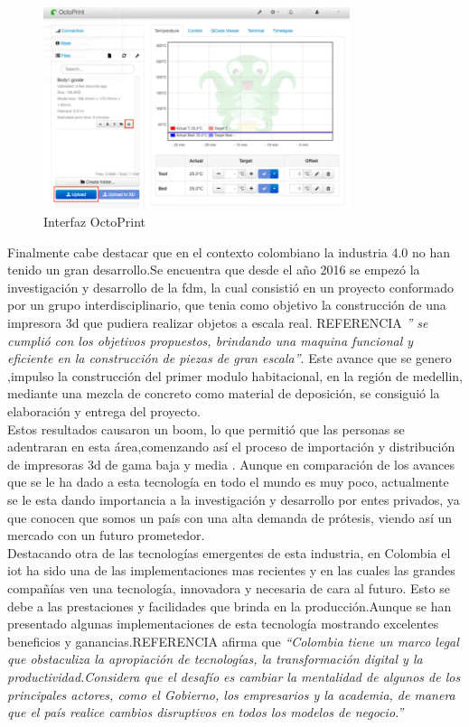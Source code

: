 \begin{figure}[H]
    \centering
    \includegraphics[width=0.8\textwidth]{Figs/octoprint.PNG}
    \caption{Interfaz OctoPrint\citep{} }
     \label{fig:octo}
\end{figure}

Finalmente cabe destacar que en el contexto colombiano la industria 4.0 no han tenido un gran desarrollo.Se encuentra que desde el año 2016 se empezó la investigación y desarrollo de la \acrshort{fdm}, la cual consistió en un proyecto conformado por un grupo interdisciplinario, que tenia como objetivo la construcción de una impresora 3d que pudiera realizar objetos a escala real. REFERENCIA\textit{ '' se cumplió con los objetivos propuestos, brindando una maquina funcional y eficiente en la construcción de piezas de gran escala''}. Este avance que se genero ,impulso la  construcción del primer modulo habitacional, en la región de medellin, mediante una mezcla de concreto como material de deposición, se consiguió la elaboración y entrega del proyecto.\\

Estos resultados causaron un boom, lo que permitió que las personas se adentraran en esta área,comenzando así el proceso de importación y distribución de impresoras 3d de gama baja y media . Aunque en comparación de los avances que se le ha dado a esta tecnología en todo el mundo es muy poco, actualmente se le esta dando importancia a la investigación y desarrollo por entes privados, ya que conocen que somos un país con una alta demanda de prótesis, viendo así un mercado con un futuro prometedor.\\

Destacando otra de las tecnologías emergentes de esta industria, en Colombia el \acrshort{iot} ha sido una de las implementaciones mas recientes y en las cuales las grandes compañías ven una tecnología, innovadora y necesaria de cara al futuro. Esto se debe a las prestaciones y facilidades que brinda en la producción.Aunque se han presentado algunas implementaciones de esta tecnología mostrando excelentes beneficios y ganancias.\citep{}REFERENCIA afirma que \textit{“Colombia tiene un marco legal que obstaculiza la apropiación de tecnologías, la transformación digital y la productividad.Considera que el desafío es cambiar la mentalidad de algunos de los principales actores, como el Gobierno, los empresarios y la academia, de manera que el país realice cambios disruptivos en todos los modelos de negocio.''}\\

